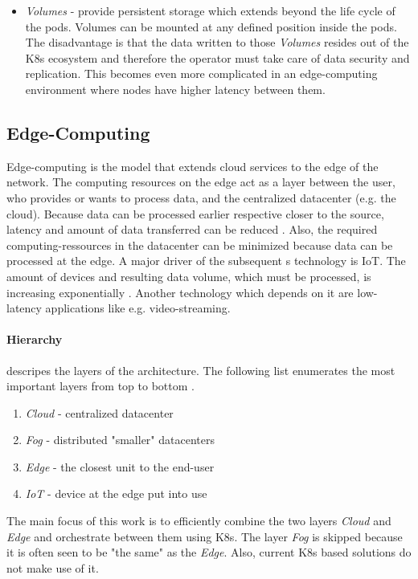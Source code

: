 \documentclass[MSC,Master,english]{twbook}%
\begin{document}
\begin{itemize}
    \item \textit{Volumes} - provide persistent storage which extends beyond the life cycle of the pods. Volumes can be mounted at any defined position inside the pods. The disadvantage is that the data written to those \textit{Volumes} resides out of the \ac{K8s} ecosystem and therefore the operator must take care of data security and replication. This becomes even more complicated in an edge-computing environment where nodes have higher latency between them.
\end{itemize}

\subsection{Edge-Computing}
Edge-computing is the model that extends cloud services to the edge of the
network. The computing resources on the edge act as a layer between the user, who provides or wants to process data, and the centralized datacenter (e.g. the cloud). Because data can be processed earlier respective closer to the source, latency and amount of data transferred can be reduced \cite{intro-edge}. Also, the required computing-ressources in the datacenter can be minimized because data can be processed at the edge. A major driver of the subsequent s technology is \ac{IoT}. The amount of devices and resulting data volume, which must be processed, is increasing exponentially \cite{SotE21}. Another technology which depends on it are low-latency applications like e.g. video-streaming. 

\paragraph{Hierarchy} descripes the layers of the architecture. The following list enumerates the most important layers from top to bottom \cite{intro-edge}.
\begin{enumerate}
    \item \textit{Cloud} - centralized datacenter
    \item \textit{Fog} - distributed "smaller" datacenters
    \item \textit{Edge} - the closest unit to the end-user
    \item \textit{\ac{IoT}} - device at the edge put into use
\end{enumerate}


The main focus of this work is to efficiently combine the two layers \textit{Cloud} and \textit{Edge} and orchestrate between them using \ac{K8s}. The layer \textit{Fog} is skipped because it is often seen to be "the same" as the \textit{Edge}. Also, current \ac{K8s} based solutions do not make use of it. 
\end{document}
